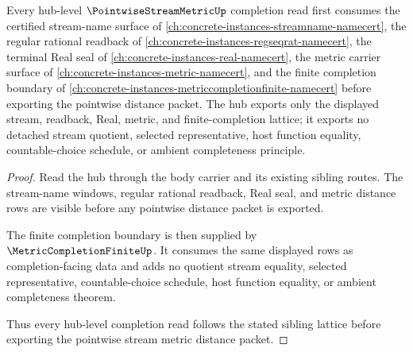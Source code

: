 \begin{theorem}
\label{thm:pointwise-stream-metric-orphan-lattice}
Every hub-level $\PointwiseStreamMetricUp$ completion read first consumes the certified stream-name surface of \autoref{ch:concrete-instances-streamname-namecert}, the regular rational readback of \autoref{ch:concrete-instances-regseqrat-namecert}, the terminal Real seal of \autoref{ch:concrete-instances-real-namecert}, the metric carrier surface of \autoref{ch:concrete-instances-metric-namecert}, and the finite completion boundary of \autoref{ch:concrete-instances-metriccompletionfinite-namecert} before exporting the pointwise distance packet. The hub exports only the displayed stream, readback, Real, metric, and finite-completion lattice; it exports no detached stream quotient, selected representative, host function equality, countable-choice schedule, or ambient completeness principle.
\end{theorem}
\begin{proof}
Read the hub through the body carrier and its existing sibling routes. The stream-name windows, regular rational readback, Real seal, and metric distance rows are visible before any pointwise distance packet is exported.

The finite completion boundary is then supplied by $\MetricCompletionFiniteUp$. It consumes the same displayed rows as completion-facing data and adds no quotient stream equality, selected representative, countable-choice schedule, host function equality, or ambient completeness theorem.

Thus every hub-level completion read follows the stated sibling lattice before exporting the pointwise stream metric distance packet.
\end{proof}
